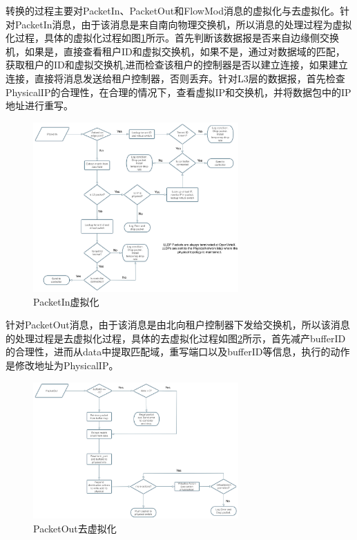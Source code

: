 转换的过程主要对PacketIn、PacketOut和FlowMod消息的虚拟化与去虚拟化。针对PacketIn消息，由于该消息是来自南向物理交换机，所以消息的处理过程为虚拟化过程，具体的虚拟化过程如图\ref{fig:packetin}所示。首先判断该数据报是否来自边缘侧交换机，如果是，直接查看租户ID和虚拟交换机，如果不是，通过对数据域的匹配，获取租户的ID和虚拟交换机,进而检查该租户的控制器是否以建立连接，如果建立连接，直接将消息发送给租户控制器，否则丢弃。针对L3层的数据报，首先检查PhysicalIP的合理性，在合理的情况下，查看虚拟IP和交换机，并将数据包中的IP地址进行重写。

\begin{figure}[!htb]
  \centering
  \includegraphics[width=0.7\textwidth]{logo/PacketIn.png}
  \caption{PacketIn虚拟化}
  \label{fig:packetin}
\end{figure}

针对PacketOut消息，由于该消息是由北向租户控制器下发给交换机，所以该消息的处理过程是去虚拟化过程，具体的去虚拟化过程如图\ref{fig:packetout}所示，首先减产bufferID的合理性，进而从data中提取匹配域，重写端口以及bufferID等信息，执行的动作是修改地址为PhysicalIP。

\begin{figure}[!htb]
  \centering
  \includegraphics[width=0.7\textwidth]{logo/PacketOut.png}
  \caption{PacketOut去虚拟化}
  \label{fig:packetout}
\end{figure}

